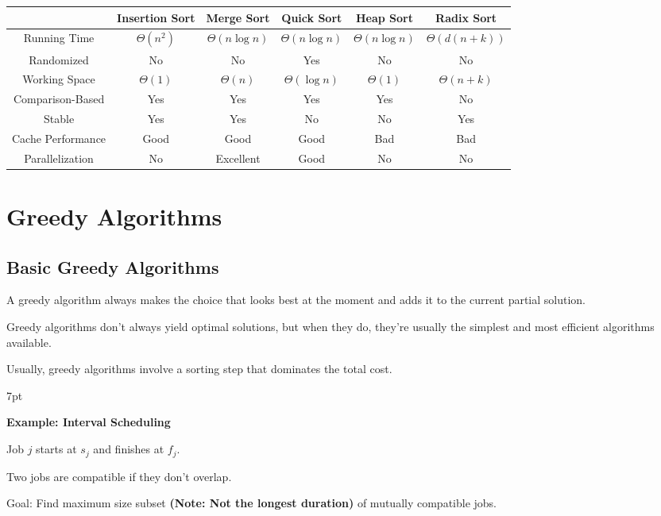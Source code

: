 \documentclass[10pt]{article}
\newenvironment{formal}[2]{%
	\def\FrameCommand{%
		\hspace{1pt}%
		{\color{#1}\vrule width 2pt}%
		{\color{#2}\vrule width 4pt}%
		\colorbox{#2}%
	}%
	\MakeFramed{\advance\hsize-\width\FrameRestore}%
	\noindent\hspace{-4.55pt}%
	\begin{adjustwidth}{}{7pt}%
		\vspace{2pt}\vspace{2pt}%
	}
	{%
		\vspace{2pt}\end{adjustwidth}\endMakeFramed%
}
\begin{document}
\begin{center}
\renewcommand{\arraystretch}{1.5}
\begin{tabular}{|c|c|c|c|c|c|}
	\hline
	& Insertion Sort & Merge Sort & Quick Sort & Heap Sort & Radix Sort \\
	\hline
	Running Time & $\Theta(n^2)$ & $\Theta(n\log n)$ & $\Theta(n\log n)$ & $\Theta(n\log n)$ & $\Theta(d(n+k))$ \\
	\hline
	Randomized & No & No & Yes & No & No \\
	\hline
	Working Space & $\Theta(1)$ & $\Theta(n)$ & $\Theta(\log n)$ & $\Theta(1)$ & $\Theta(n+k)$ \\
	\hline
	Comparison-Based & Yes & Yes & Yes & Yes & No \\
	\hline
	Stable & Yes & Yes & No & No & Yes \\
	\hline
	Cache Performance & Good & Good & Good & Bad & Bad \\
	\hline
	Parallelization & No & Excellent & Good & No & No \\
	\hline
\end{tabular}
\end{center}

\newpage

\section{Greedy Algorithms}

\subsection{Basic Greedy Algorithms}

A greedy algorithm always makes the choice that looks best at the moment and adds it to the current partial solution.

Greedy algorithms don't always yield optimal solutions, but when they do, they're usually the simplest and most efficient algorithms available.

Usually, greedy algorithms involve a sorting step that dominates the total cost.

\begin{formal}{Brown}{brownshade}
	
	\textbf{Example: Interval Scheduling}

	Job $j$ starts at $s_j$ and finishes at $f_j$.

	Two jobs are compatible if they don't overlap.

	Goal: Find maximum size subset \textbf{(Note: Not the longest duration)} of mutually compatible jobs.

\end{formal}
\end{document}
